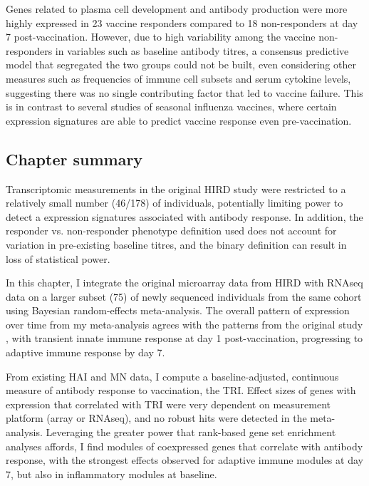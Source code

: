 Genes related to plasma cell development and antibody production were more highly expressed in 23 vaccine responders compared to 18 non-responders at day 7 post-vaccination.
However, due to high variability among the vaccine non-responders in variables such as baseline antibody titres, a consensus predictive model that segregated the two groups could not be built, even considering other measures such as frequencies of immune cell subsets and serum cytokine levels, suggesting there was no single contributing factor that led to vaccine failure.
This is in contrast to several studies of seasonal influenza vaccines, where certain expression signatures are able to predict vaccine response even pre-vaccination\autocite{furman2013ApoptosisOtherImmune, tsang2014GlobalAnalysesHuman, nakaya2015SystemsAnalysisImmunity, hipc-chisignaturesprojectteam2017MulticohortAnalysisReveals}.

\subsection{Chapter summary}

Transcriptomic measurements in the original \gls{HIRD} study were restricted to a relatively small number (46/178) of individuals, potentially limiting power to detect a expression signatures associated with antibody response.
In addition, the responder vs. non-responder phenotype definition used does not account for variation in pre-existing baseline titres, and the binary definition can result in loss of statistical power\autocite{cohen1983CostDichotomization, fedorov2009ConsequencesDichotomization}.

In this chapter, I integrate the original microarray data from \gls{HIRD} with \gls{RNAseq} data on a larger subset (75) of newly sequenced individuals from the same cohort using Bayesian random-effects meta-analysis.
The overall pattern of expression over time from my meta-analysis agrees with the patterns from the original study \autocite{sobolev2016AdjuvantedInfluenzaH1N1Vaccination}, with transient innate immune response at day 1 post-vaccination, progressing to adaptive immune response by day 7.

From existing \gls{HAI} and \gls{MN} data, I compute a baseline-adjusted, continuous measure of antibody response to vaccination, the \gls{TRI}\autocite{bucasas2011EarlyPatternsGene}.
Effect sizes of genes with expression that correlated with \gls{TRI} were very dependent on measurement platform (array or \gls{RNAseq}), and no robust hits were detected in the meta-analysis.
Leveraging the greater power that rank-based gene set enrichment analyses affords, I find modules of coexpressed genes that correlate with antibody response, with the strongest effects observed for adaptive immune modules at day 7, but also in inflammatory modules at baseline.

